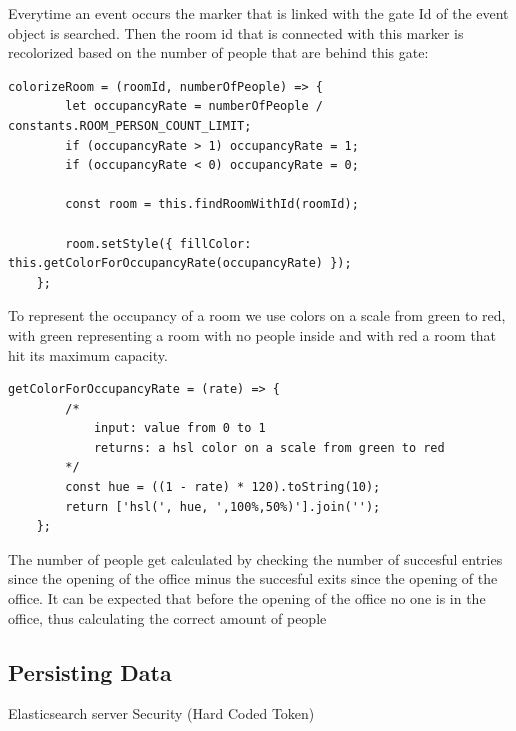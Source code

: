 Everytime an event occurs the marker that is linked with the gate Id of the event object is searched. Then the room id that is connected with this marker is recolorized based on the number of people that are behind this gate:

\begin{lstlisting}[label=colorizeRoom]
	colorizeRoom = (roomId, numberOfPeople) => {
        let occupancyRate = numberOfPeople / constants.ROOM_PERSON_COUNT_LIMIT;
        if (occupancyRate > 1) occupancyRate = 1;
        if (occupancyRate < 0) occupancyRate = 0;

        const room = this.findRoomWithId(roomId);

        room.setStyle({ fillColor: this.getColorForOccupancyRate(occupancyRate) });
    };
\end{lstlisting}

To represent the occupancy of a room we use colors on a scale from green to red, with green representing a room with no people inside and with red a room that hit its maximum capacity. 

\begin{lstlisting}[label=getColorForOccupancyRate]
    getColorForOccupancyRate = (rate) => {
        /*
            input: value from 0 to 1
            returns: a hsl color on a scale from green to red
        */
        const hue = ((1 - rate) * 120).toString(10);
        return ['hsl(', hue, ',100%,50%)'].join('');
    };
\end{lstlisting}

The number of people get calculated by checking the number of succesful entries since the opening of the office minus the succesful exits since the opening of the office.
It can be expected that before the opening of the office no one is in the office, thus calculating the correct amount of people

\subsection{Persisting Data}
\label{Persisting Data}

Elasticsearch server
Security (Hard Coded Token)

\clearpage
